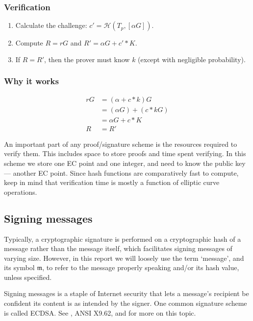 \subsubsection*{Verification}

\begin{enumerate}
	\item Calculate the challenge: \(c' = \mathcal{H}(T_p, [\alpha G])\).
	\item Compute $R = r G$ and $R' = \alpha G + c'*K$.
	\item If $R = R'$, then the prover must know $k$ (except with negligible probability).
\end{enumerate}

\subsubsection*{Why it works}

\begin{align*}
r G &= (\alpha + c*k) G \\
	&= (\alpha G) + (c*k G) \\
	&= \alpha G + c*K \\
  R &= R'
\end{align*}

An important part of any proof/signature scheme is the resources required to verify them. This includes space to store proofs and time spent verifying. In this scheme we store one EC point and one integer, and need to know the public key --- another EC point. Since hash functions are comparatively fast to compute, keep in mind that verification time is mostly a function of elliptic curve operations.


\subsection{Signing messages}
\label{sec:signing-messages}

Typically, a cryptographic signature is performed on a cryptographic hash of a message rather than the message itself, which facilitates signing messages of varying size. However, in this report we will loosely use the term `message', and its symbol $\mathfrak{m}$, to refer to the message properly speaking and/or its hash value, unless specified.

Signing messages is a staple of Internet security that lets a message's recipient be confident its content is as intended by the signer. One common signature scheme is called ECDSA. See \cite{ecdsa}, ANSI X9.62, and \cite{Hankerson:2003:GEC:940321} for more on this topic.

